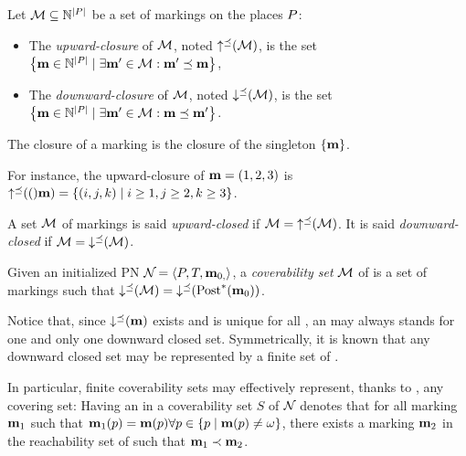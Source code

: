 

\begin{defi}
  Let $\mathcal{M} \subseteq \mathbb{N}^{\left|P\right|}$ be a set of markings on the places $P$:
  \begin{itemize}
    \item The \emph{upward-closure} of $\mathcal{M}$, noted $\operatorname{\uparrow^\preceq}(\mathcal{M})$, is the set
      $\left\{\mathbf{m} \in \mathbb{N}^{\left|P\right|} \mid \exists \mathbf{m}' \in \mathcal{M} : \mathbf{m}' \preceq \mathbf{m}\right\}$,
    \item The \emph{downward-closure} of $\mathcal{M}$, noted $\operatorname{\downarrow^\preceq}(\mathcal{M})$, is the set
      $\left\{\mathbf{m} \in \mathbb{N}^{\left|P\right|} \mid \exists \mathbf{m}' \in \mathcal{M} : \mathbf{m} \preceq \mathbf{m}'\right\}$.
  \end{itemize}
  The closure of a marking \mar is the closure of the singleton $\{\mathbf{m}\}$.
\end{defi}

For instance, the upward-closure of $\mathbf{m} = (1, 2, 3)$ is $\operatorname{\uparrow^\preceq}(()\mathbf{m}) = \left\{(i, j, k) \mid i \geq 1, j \geq 2, k \geq 3\right\}$.

\begin{defi}
  A set $\mathcal{M}$ of markings is said \emph{upward-closed} if $\mathcal{M} = \operatorname{\uparrow^\preceq}(\mathcal{M})$.
  It is said \emph{downward-closed} if $\mathcal{M} = \operatorname{\downarrow^\preceq}(\mathcal{M})$.
\end{defi}

\begin{defi}
  Given an initialized \ac{PN} $\mathcal{N}_{} = \left\langle P_{}, T_{}, \mathbf{m}_{0,}\right\rangle$, a \emph{coverability set} $\mathcal{M}$ of \namePN is a set of markings such that $\operatorname{\downarrow^\preceq}(\mathcal{M}) = \operatorname{\downarrow^\preceq}(\operatorname{Post}^*_{}(\mathbf{m}_0))$.
\end{defi}

Notice that, since $\operatorname{\downarrow^\preceq}(\mathbf{m})$ exists and is unique for all \omark \mar, an \omark may always stands for one and only one downward closed set.
Symmetrically, it is known that any downward closed set may be represented by a finite set of \omarks \citep{Geeraerts06}. 

In particular, finite coverability sets may effectively represent, thanks to \omarks, any covering set:
Having an \omark \mar in a coverability set $S$ of $\mathcal{N}_{}$ denotes that for all marking $\mathbf{m}_1$ such that $\mathbf{m}_1(p) = \mathbf{m}(p) \forall p \in \{p \mid \mathbf{m}(p) \neq \omega\}$, there exists a marking $\mathbf{m}_2$ in the reachability set of \namePN such that $\mathbf{m}_1 \prec \mathbf{m}_2$.

